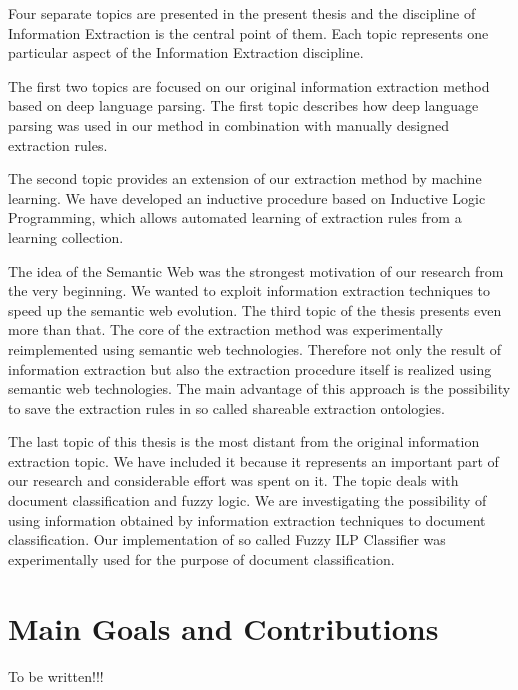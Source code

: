 
Four separate topics are presented in the present thesis and the discipline of Information Extraction is the central point of them. Each topic represents one particular aspect of the Information Extraction discipline.

The first two topics are focused on our original information extraction method based on deep language parsing. The first topic describes how deep language parsing was used in our method in combination with manually designed extraction rules.

The second topic provides an extension of our extraction method by machine learning. We have developed an inductive procedure based on Inductive Logic Programming, which allows automated learning of extraction rules from a learning collection.

The idea of the Semantic Web was the strongest motivation of our research from the very beginning. We wanted to exploit information extraction techniques to speed up the semantic web evolution. The third topic of the thesis presents even more than that. The core of the extraction method was experimentally reimplemented using semantic web technologies. Therefore not only the result of information extraction but also the extraction procedure itself is realized using semantic web technologies. The main advantage of this approach is the possibility to save the extraction rules in so called shareable extraction ontologies.

The last topic of this thesis is the most distant from the original information extraction topic. We have included it because it represents an important part of our research and considerable effort was spent on it. The topic deals with document classification and fuzzy logic. We are investigating the possibility of using information obtained by information extraction techniques to document classification. Our implementation of so called Fuzzy ILP Classifier was experimentally used for the purpose of document classification.

\section{Main Goals and Contributions}

To be written!!!

